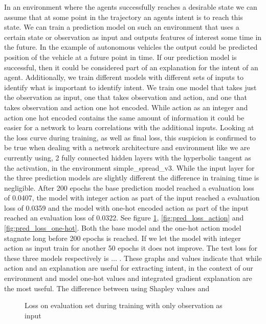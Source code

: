\documentclass[UKenglish]{uiomasterthesis}
\begin{document}
In an environment where the agents successfully reaches a desirable state we can assume that at some point in the trajectory an agents intent is to reach this state. We can train a prediction model on such an environment that uses a certain state or observation as input and outputs features of interest some time in the future. In the example of autonomous vehicles the output could be predicted position of the vehicle at a future point in time. If our prediction model is successful, then it could be considered part of an explanation for the intent of an agent.
Additionally, we train different models with different sets of inputs to identify what is important to identify intent. We train one model that takes just the observation as input, one that takes observation and action, and one that takes observation and action one hot encoded. While action as an integer and action one hot encoded contains the same amount of information it could be easier for a network to learn correlations with the additional inputs. Looking at the loss curve during training, as well as final loss, this suspicion is confirmed to be true when dealing with a network architecture and environment like we are currently using, 2 fully connected hidden layers with the hyperbolic tangent as the activation, in the environment simple\_spread\_v3. While the input layer for the three prediction models are slightly different the difference in training time is negligible. 
After 200 epochs the base prediction model reached a evaluation loss of 0.0407, the model with integer action as part of the input reached a evaluation loss of 0.0359 and the model with one-hot encoded action as part of the input reached an evaluation loss of 0.0322. See figure \ref{fig:pred_loss_none}, \ref{fig:pred_loss_action} and \ref{fig:pred_loss_one-hot}. Both the base model and the one-hot action model stagnate long before 200 epochs is reached. If we let the model with integer action as input train for another 50 epochs it does not improve. The test loss for these three models respectively is ... . These graphs and values indicate that while action and an explanation are useful for extracting intent, in the context of our environment and model one-hot values and integrated gradient explanation are the most useful. The difference between using Shapley values and


\begin{figure}[!ht]
	\caption{Loss on evaluation set during training with only observation as input}
	\label{fig:pred_loss_none} 
\end{figure}
\end{document}
